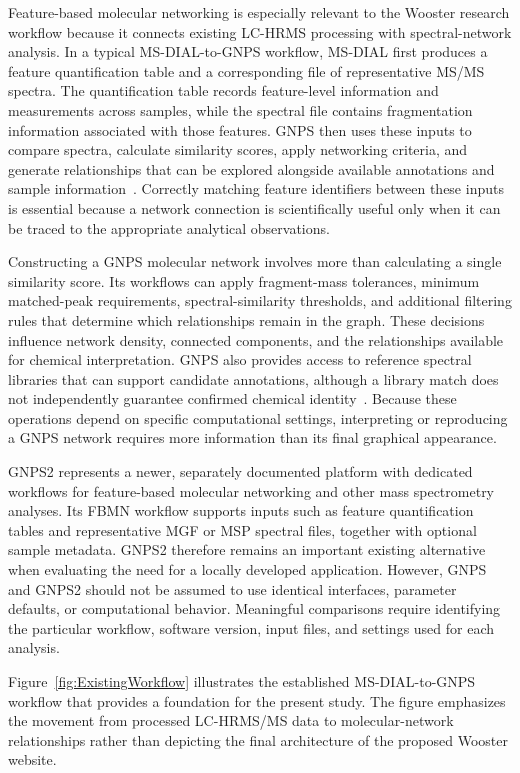         Feature-based molecular networking is especially relevant to the Wooster research workflow because it connects existing LC-HRMS processing with spectral-network analysis. In a typical MS-DIAL-to-GNPS workflow, MS-DIAL first produces a feature quantification table and a corresponding file of representative MS/MS spectra. The quantification table records feature-level information and measurements across samples, while the spectral file contains fragmentation information associated with those features. GNPS then uses these inputs to compare spectra, calculate similarity scores, apply networking criteria, and generate relationships that can be explored alongside available annotations and sample information~\cite{Nothias2020}. Correctly matching feature identifiers between these inputs is essential because a network connection is scientifically useful only when it can be traced to the appropriate analytical observations.

        Constructing a GNPS molecular network involves more than calculating a single similarity score. Its workflows can apply fragment-mass tolerances, minimum matched-peak requirements, spectral-similarity thresholds, and additional filtering rules that determine which relationships remain in the graph. These decisions influence network density, connected components, and the relationships available for chemical interpretation. GNPS also provides access to reference spectral libraries that can support candidate annotations, although a library match does not independently guarantee confirmed chemical identity~\cite{Wang2016,Nothias2020}. Because these operations depend on specific computational settings, interpreting or reproducing a GNPS network requires more information than its final graphical appearance.

        GNPS2 represents a newer, separately documented platform with dedicated workflows for feature-based molecular networking and other mass spectrometry analyses. Its FBMN workflow supports inputs such as feature quantification tables and representative MGF or MSP spectral files, together with optional sample metadata. GNPS2 therefore remains an important existing alternative when evaluating the need for a locally developed application. However, GNPS and GNPS2 should not be assumed to use identical interfaces, parameter defaults, or computational behavior. Meaningful comparisons require identifying the particular workflow, software version, input files, and settings used for each analysis.

        Figure~\ref{fig:ExistingWorkflow} illustrates the established MS-DIAL-to-GNPS workflow that provides a foundation for the present study. The figure emphasizes the movement from processed LC-HRMS/MS data to molecular-network relationships rather than depicting the final architecture of the proposed Wooster website.

